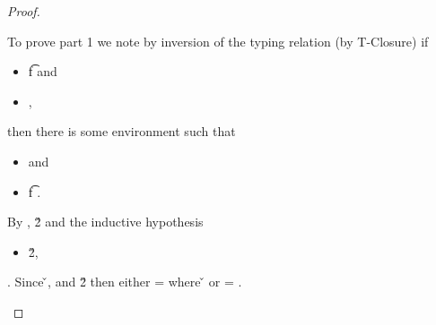 \begin{lemma}
\begin{enumerate}
\begin{proof}
\begin{case}[T-App]
\begin{itemize}
\begin{subcase}[B-BetaClosure]
         To prove part 1 we note by inversion of the typing relation (by T-Closure) if
         \begin{itemize}
           \item 
  \judgement {\propenv{}} { {\ArrowOne {\x{}} {\s{}}
                                                       {\t{f}}
                                                       {
                                                                   {}}
                                                               {}}}
                {
                            {}}
                          {} and
              \item 
                \opsem {\openv{}}
                       {}
                       { {\abs {\x{}} {\s{}} {}}},
         \end{itemize}

         then there is some environment {\propenvc{}} such that
         \begin{itemize}
           \item
               and
            \item
              \judgement {\propenvc{}} { {\t{f}}}
                               {
                                           {}}
                               {}.
         \end{itemize}

         By ,
            {\opsem {\openv{}}
                    {}
                    {\v{2}}}
         and
         the inductive hypothesis 
         \begin{itemize}
           \item
             \opsem {\openv{}}
                    {}
                    {\v{2}},
         \end{itemize}
         
         .
         Since 
         {}
         {\v{}},
  \judgement {\propenv{}}
                 { {\s{}}}
                 {
                             {}}
                 {} 
         and
  \opsem {\openv{}}
         {}
         {\v{2}}
         then either 
                              \object{} = {
                                                {}
                                                {\x{}}}
                                                where
   \inopenv {\openv{}} {\object{}} {\v{}}
                              or \object{} = \emptyobject{}.


\end{subcase}
\end{itemize}
\end{case}
\end{proof}
\end{enumerate}
\end{lemma}
